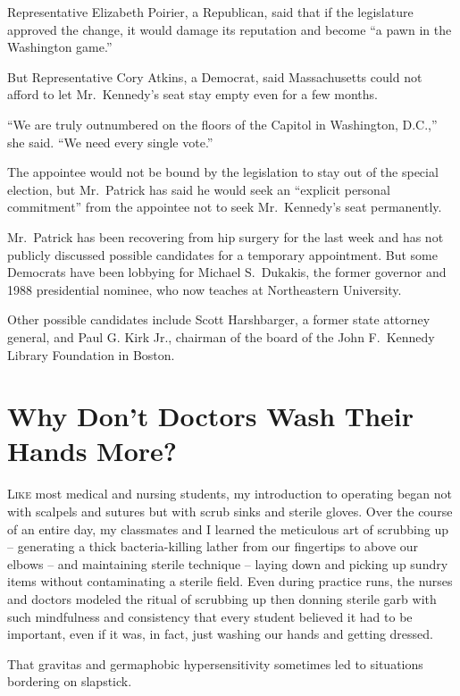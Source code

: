 ﻿\documentclass[12pt]{article}
\begin{document}
Representative Elizabeth Poirier, a Republican, said that if the legislature approved the change, it
would damage its reputation and become ``a pawn\cite{pawn} in the Washington game.''

But Representative Cory Atkins, a Democrat, said Massachusetts could not afford to let Mr.~Kennedy's
seat stay empty even for a few months.

``We are truly outnumbered on the floors of the Capitol in Washington, D.C.,'' she said. ``We need
every single vote.''

The appointee would not be bound by the legislation to stay out of the special election, but
Mr.~Patrick has said he would seek an ``explicit personal commitment'' from the appointee not to
seek Mr.~Kennedy's seat permanently.

Mr.~Patrick has been recovering from hip surgery for the last week and has not publicly discussed
possible candidates for a temporary appointment. But some Democrats have been lobbying for Michael
S.~Dukakis, the former governor and 1988 presidential nominee, who now teaches at Northeastern
University.

Other possible candidates include Scott Harshbarger, a former state attorney general, and Paul G.
Kirk Jr., chairman of the board of the John F.~Kennedy Library Foundation in Boston.

\section{Why Don't Doctors Wash Their Hands More?}

\lettrine{L}{ike} most medical and nursing students, my introduction to operating began not with
scalpels\cite{scalpel} and sutures\cite{suture} but with scrub\cite{scrub} sinks and
sterile\cite{sterile} gloves. Over the course of an entire day, my classmates and I learned the
meticulous art of scrubbing up -- generating a thick bacteria-killing lather from our fingertips to
above our elbows -- and maintaining sterile technique -- laying down and picking up sundry items
without contaminating a sterile field. Even during practice runs, the nurses and doctors modeled the
ritual of scrubbing up then donning sterile garb with such mindfulness and consistency that every
student believed it had to be important, even if it was, in fact, just washing our hands and getting
dressed.

That gravitas and germaphobic hypersensitivity sometimes led to situations bordering on slapstick.
\end{document}
